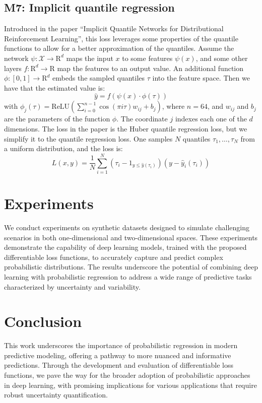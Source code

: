 \documentclass{article}
\begin{document}
\subsection{M7: Implicit quantile regression}
Introduced in the paper ``Implicit Quantile Networks for Distributional Reinforcement Learning'', this loss leverages some properties of the quantile functions to allow for a better approximation of the quantiles. Assume the network $\psi : \mathcal{X} \to \mathrm{R}^d$ maps the input $x$ to some features $\psi(x)$, and some other layers $f: \mathrm{R}^d \to \mathrm{R}$ map the features to an output value. An additional function $\phi : [0,1] \to \mathrm{R}^d$ embeds the sampled quantiles $\tau$ into the feature space. Then we have that the estimated value is:
\begin{equation}
    \hat y = f(\psi(x) \cdot \phi(\tau))
\end{equation}
with $\phi_j(\tau) = \text{ReLU}\left(\sum_{i=0}^{n-1} \cos(\pi i \tau) w_{ij} + b_j\right)$, where $n=64$, and $w_{ij}$ and $b_j$ are the parameters of the function $\phi$. The coordinate $j$ indexes each one of the $d$ dimensions.
The loss in the paper is the Huber quantile regression loss, but we simplify it to the quantile regression loss. One samples $N$ quantiles $\tau_1, \dots, \tau_N$ from a uniform distribution, and the loss is:
\begin{equation}
    L(x, y) = \frac{1}{N} \sum_{i=1}^N (\tau_i - \mathrm{1}_{y \leq \hat y (\tau_i)})(y - \hat{y}_i(\tau_i))
\end{equation}



\section{Experiments}
We conduct experiments on synthetic datasets designed to simulate challenging scenarios in both one-dimensional and two-dimensional spaces. These experiments demonstrate the capability of deep learning models, trained with the proposed differentiable loss functions, to accurately capture and predict complex probabilistic distributions. The results underscore the potential of combining deep learning with probabilistic regression to address a wide range of predictive tasks characterized by uncertainty and variability.

\section{Conclusion}
This work underscores the importance of probabilistic regression in modern predictive modeling, offering a pathway to more nuanced and informative predictions. Through the development and evaluation of differentiable loss functions, we pave the way for the broader adoption of probabilistic approaches in deep learning, with promising implications for various applications that require robust uncertainty quantification.
\end{document}
